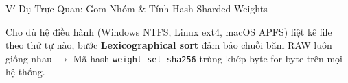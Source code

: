 \documentclass[aspectratio=169, xcolor=table]{beamer}
\begin{document}
\begin{frame}{Ví Dụ Trực Quan: Gom Nhóm \& Tính Hash Sharded Weights}
\begin{center}
{
    }
    \end{center}
    \vspace{-0.15cm}
    \begin{infobox}
        \scriptsize
        Cho dù hệ điều hành (Windows NTFS, Linux ext4, macOS APFS) liệt kê file theo thứ tự nào, bước \textbf{Lexicographical sort} đảm bảo chuỗi băm RAW luôn giống nhau $\to$ Mã hash \texttt{weight\_set\_sha256} trùng khớp byte-for-byte trên mọi hệ thống.
    \end{infobox}
\end{frame}
\end{document}
